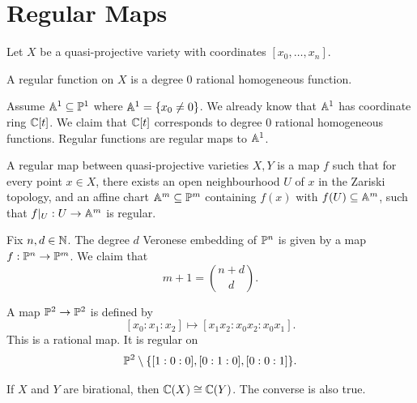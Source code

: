 
\section{Regular Maps}

Let $X$ be a quasi-projective variety with coordinates $[x_0, \ldots, x_n]$.

\begin{definition}
    A regular function on $X$ is a degree $0$ rational homogeneous function.
\end{definition}

Assume $\aa^1\subseteq \pp^1$ where $\aa^1 = \{x_0\neq 0\}$.
We already know that $\aa^1$ has coordinate ring $\c[t]$.
We claim that $\c[t]$ corresponds to degree $0$ rational homogeneous functions.
Regular functions are regular maps to $\aa^1$.

\begin{lemma*}{
    A regular map between quasi-projective varieties $X,Y$ is a map $f$ such that for every point $x\in X$, there exists an open neighbourhood $U$ of $x$ in the Zariski topology, and an affine chart $\aa^m\subseteq\pp^m$ containing $f(x)$ with $f(U)\subseteq\aa^m$, such that $f|_U : U\to \aa^m$ is regular.
}
\end{lemma*}

\begin{example}
    Fix $n,d\in\n$.
    The degree $d$ Veronese embedding of $\pp^n$ is given by a map $f : \pp^n\to\pp^m$.
    We claim that
    \[
    m + 1 = \binom{n+d}{d}.
    \]
\end{example}

\begin{example}
    A map $\pp^2\to\pp^2$ is defined by
    \[
    [x_0:x_1:x_2]\mapsto[x_{1}x_2:x_{0}x_2:x_{0}x_1].
    \]
    This is a rational map.
    It is regular on
    \[
    \pp^2\setminus\{[1:0:0], [0:1:0], [0:0:1]\}.
    \]
\end{example}

\begin{lemma*}{
    If $X$ and $Y$ are birational, then $\c(X)\cong\c(Y)$.
    The converse is also true.
}
\end{lemma*}